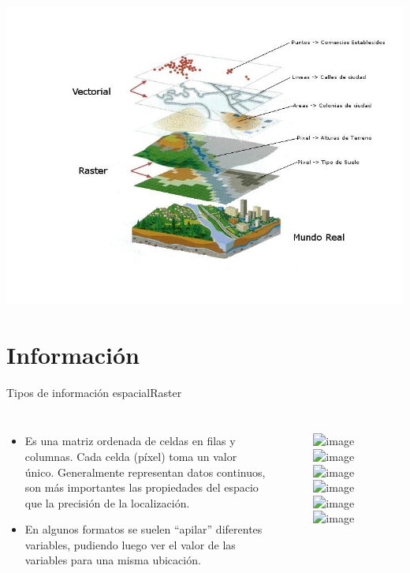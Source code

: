 \documentclass{beamer}
\begin{document}
\begin{frame}[plain]{}
	\includegraphics[width=\textwidth]{GIS}
\end{frame}

\section{Información}

\begin{frame}{Tipos de información espacial}{Raster}
	\begin{columns}
			\begin{itemize}
				\item Es una matriz ordenada de celdas en filas y columnas. Cada celda (píxel) toma un valor único. Generalmente representan datos continuos, son más importantes las propiedades del espacio que la precisión de la localización.
				\item<6> En algunos formatos se suelen “apilar” diferentes variables, pudiendo luego ver el valor de las variables para una misma ubicación.
			\end{itemize}
		    \begin{figure}
		    	\includegraphics<1>[width=0.8\textwidth]{raster1}
		    	\includegraphics<2>[width=0.8\textwidth]{raster2}
		    	\includegraphics<3>[width=0.8\textwidth]{raster3}
		    	\includegraphics<4>[width=0.8\textwidth]{raster4}
		    	\includegraphics<5>[width=0.8\textwidth]{raster5}
		    	\includegraphics<6>[width=0.9\textwidth]{multi}
		    \end{figure} 
	\end{columns}
\end{frame}
\end{document}
